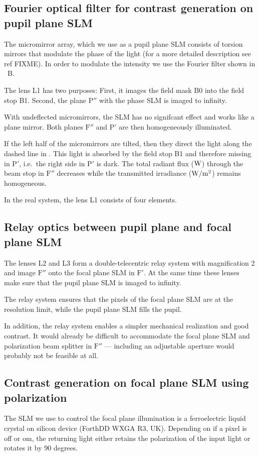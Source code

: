 \subsection{Fourier optical filter for contrast generation on pupil
  plane SLM}

The micromirror array, which we use as a pupil plane SLM consists of
torsion mirrors that modulate the phase of the light (for a more
detailed description see ref FIXME). In order to modulate the
intensity we use the Fourier filter shown in ~B.

The lens L1 has two purposes: First, it images the field mask B0 into
the field stop B1. Second, the plane $\textrm{P}''$ with the phase SLM
is imaged to infinity.

With undeflected micromirrors, the SLM has no signifcant effect and
works like a plane mirror. Both planes $\textrm{F}''$ and
$\textrm{P}'$ are then homogeneously illuminated.

If the left half of the micromirrors are tilted, then they direct the
light along the dashed line in . This light is
absorbed by the field stop B1 and therefore missing in $\textrm{P}'$,
i.e.\ the right side in $\textrm{P}'$ is dark. The total radiant flux
($\unit[]{W}$) through the beam stop in $\textrm{F}''$ decreases while
the transmitted irradiance ($\unit[]{W/m^2}$) remains homogeneous.

In the real system, the lens L1 consists of four elements.

\subsection{Relay optics between pupil plane and focal plane SLM}
The lenses L2 and L3 form a double-telecentric relay system with
magnification 2 and image $\textrm{F}''$ onto the focal plane SLM in
$\textrm{F}'$. At the same time these lenses make sure that the pupil
plane SLM is imaged to infinity.
 
The relay system ensures that the pixels of the focal plane SLM are at
the resolution limit, while the pupil plane SLM fills the pupil.

In addition, the relay system enables a simpler mechanical realization
and good contrast. It would already be difficult to accommodate the
focal plane SLM and polarization beam splitter in $\textrm{F}''$ ---
including an adjustable aperture would probably not be feasible at
all.


\subsection{ Contrast generation on focal plane SLM using
  polarization}
The SLM we use to control the focal plane illumination is a
ferroelectric liquid crystal on silicon device (ForthDD WXGA R3,
UK). Depending on if a pixel is off or om, the returning light either
retains the polarization of the input light or rotates it by 90
degrees.

